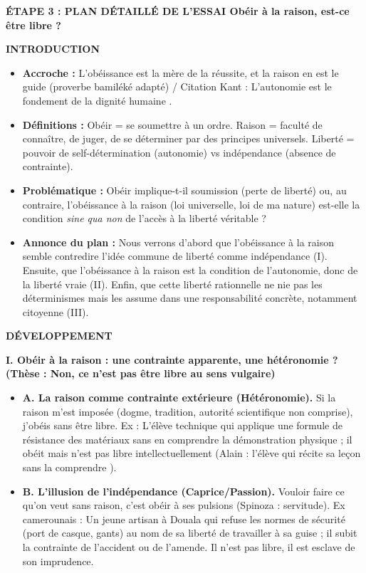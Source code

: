 \documentclass[11pt]{article}
\newcommand{\cle}[1]{{\popxbold\color{popdark}#1}}
\begin{document}
\begin{exoresolu}
\vspace{0.5cm}
\textbf{ÉTAPE 3 : PLAN DÉTAILLÉ DE L'ESSAI \og Obéir à la raison, est-ce être libre ? \fg}

\textbf{INTRODUCTION}
\begin{itemize}
    \item \textbf{Accroche :} \og L'obéissance est la mère de la réussite, et la raison en est le guide \fg (proverbe bamiléké adapté) / Citation Kant : \og L'autonomie est le fondement de la dignité humaine \fg.
    \item \textbf{Définitions :} Obéir = se soumettre à un ordre. Raison = faculté de connaître, de juger, de se déterminer par des principes universels. Liberté = pouvoir de self-détermination (\cle{autonomie}) vs indépendance (absence de contrainte).
    \item \textbf{Problématique :} Obéir implique-t-il soumission (perte de liberté) ou, au contraire, l'obéissance à la raison (loi universelle, loi de ma nature) est-elle la condition \emph{sine qua non} de l'accès à la liberté véritable ?
    \item \textbf{Annonce du plan :} Nous verrons d'abord que l'obéissance à la raison semble contredire l'idée commune de liberté comme indépendance (I). Ensuite, que l'obéissance à la raison est la condition de l'autonomie, donc de la liberté vraie (II). Enfin, que cette liberté rationnelle ne nie pas les déterminismes mais les assume dans une responsabilité concrète, notamment citoyenne (III).
\end{itemize}

\textbf{DÉVELOPPEMENT}

\textbf{I. Obéir à la raison : une contrainte apparente, une hétéronomie ? (Thèse : Non, ce n'est pas être libre au sens vulgaire)}
\begin{itemize}
    \item \textbf{A. La raison comme contrainte extérieure (\cle{Hétéronomie}).} Si la raison m'est imposée (dogme, tradition, autorité scientifique non comprise), j'obéis sans être libre. Ex : L'élève technique qui applique une formule de résistance des matériaux sans en comprendre la démonstration physique ; il \og obéit \fg mais n'est pas libre intellectuellement (Alain : \og l'élève qui récite sa leçon sans la comprendre \fg).
    \item \textbf{B. L'illusion de l'indépendance (Caprice/Passion).} Vouloir \og faire ce qu'on veut \fg sans raison, c'est obéir à ses pulsions (Spinoza : \cle{servitude}). Ex camerounais : Un jeune artisan à Douala qui refuse les normes de sécurité (port de casque, gants) au nom de \og sa liberté \fg de travailler \og à sa guise \fg ; il subit la contrainte de l'accident ou de l'amende. Il n'est pas libre, il est esclave de son imprudence.
\end{itemize}


\end{exoresolu}
\end{document}
